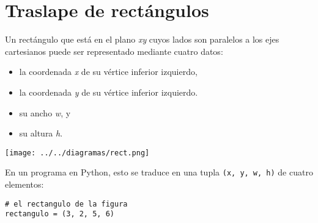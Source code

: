 \section{Traslape de rectángulos}

Un rectángulo que está en el plano \emph{xy} cuyos lados son paralelos a
los ejes cartesianos puede ser representado mediante cuatro datos:

\begin{itemize}
\item
  la coordenada \emph{x} de su vértice inferior izquierdo,
\item
  la coordenada \emph{y} de su vértice inferior izquierdo.
\item
  su ancho \emph{w}, y
\item
  su altura \emph{h}.
\end{itemize}

\texttt{[image: ../../diagramas/rect.png]}

En un programa en Python, esto se traduce en una tupla
\lstinline!(x, y, w, h)! de cuatro elementos:

\begin{lstlisting}
# el rectangulo de la figura
rectangulo = (3, 2, 5, 6)
\end{lstlisting}

